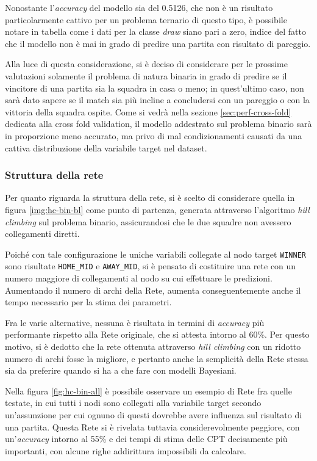 \documentclass[hidelinks, 12pt]{article}
\begin{document}
Nonostante l'\textit{accuracy} del modello sia del 0.5126, che non è un risultato particolarmente cattivo per un problema ternario di questo tipo, è possibile notare in tabella come i dati per la classe \textit{draw} siano pari a zero, indice del fatto che il modello non è mai in grado di predire una partita con risultato di pareggio.

\vspace{4ex}

Alla luce di questa considerazione, si è deciso di considerare per le prossime valutazioni solamente il problema di natura binaria in grado di predire se il vincitore di una partita sia la squadra in casa o meno; in quest'ultimo caso, non sarà dato sapere se il match sia più incline a concludersi con un pareggio o con la vittoria della squadra ospite. Come si vedrà nella sezione \ref{sec:perf-cross-fold} dedicata alla cross fold validation, il modello addestrato sul problema binario sarà in proporzione meno accurato, ma privo di mal condizionamenti causati da una cattiva distribuzione della variabile target nel dataset.


\subsubsection{Struttura della rete}

Per quanto riguarda la struttura della rete, si è scelto di considerare quella in figura \ref{img:hc-bin-bl} come punto di partenza, generata attraverso l'algoritmo \textit{hill climbing} sul problema binario, assicurandosi che le due squadre non avessero collegamenti diretti.

Poiché con tale configurazione le uniche variabili collegate al nodo target \texttt{WINNER} sono risultate \texttt{HOME\_MID} e \texttt{AWAY\_MID}, si è pensato di costituire una rete con un numero maggiore di collegamenti al nodo su cui effettuare le predizioni. Aumentando il numero di archi della Rete, aumenta conseguentemente anche il tempo necessario per la stima dei parametri.

Fra le varie alternative, nessuna è risultata in termini di \textit{accuracy} più performante rispetto alla Rete originale, che si attesta intorno al 60\%. Per questo motivo, si è dedotto che la rete ottenuta attraverso \textit{hill climbing} con un ridotto numero di archi fosse la migliore, e pertanto anche la semplicità della Rete stessa sia da preferire quando si ha a che fare con modelli Bayesiani.

\pagebreak
Nella figura \ref{fig:hc-bin-all} è possibile osservare un esempio di Rete fra quelle testate, in cui tutti i nodi sono collegati alla variabile target secondo un'assunzione per cui ognuno di questi dovrebbe avere influenza sul risultato di una partita. Questa Rete si è rivelata tuttavia considerevolmente peggiore, con un'\textit{accuracy} intorno al 55\% e dei tempi di stima delle CPT decisamente più importanti, con alcune righe addirittura impossibili da calcolare.
\end{document}
